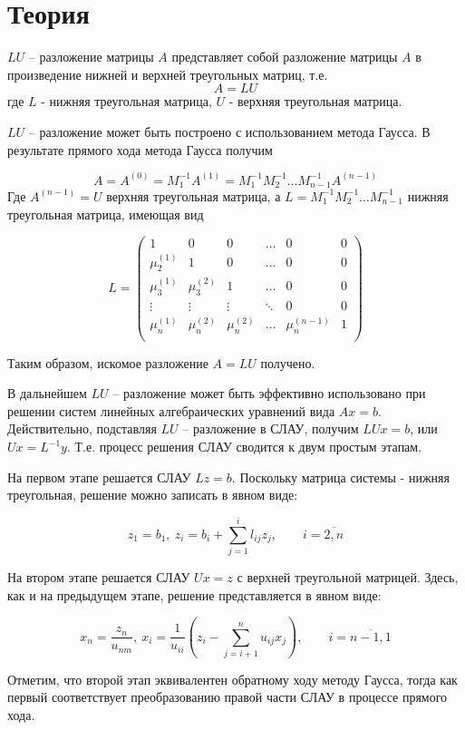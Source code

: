 \section*{Теория}

$LU$ – разложение матрицы $A$ представляет собой разложение 
матрицы $A$ в произведение
нижней и верхней треугольных матриц, т.е.
$$A= LU$$
где $L$ - нижняя треугольная матрица, $U$ - верхняя
треугольная матрица.

$LU$ – разложение может быть построено с использованием
метода Гаусса. В результате прямого
хода метода Гаусса получим

$$A=A^{(0)} = M^{-1}_1A^{(1)} = M^{-1}_1M^{-1}_2
\dots M^{-1}_{n-1}A^{(n-1)}$$
Где $A^{(n-1)} = U$ верхняя треугольная матрица,
а $L=M^{-1}_1M^{-1}_2\dots M^{-1}_{n-1}$ нижняя треугольная
матрица, имеющая вид

$$L=\begin{pmatrix}
    1 & 0 & 0 & \ldots & 0 & 0 \\
    \mu^{(1)}_2 & 1 & 0 & \ldots & 0 & 0 \\
    \mu^{(1)}_3 & \mu^{(2)}_3 & 1 & \ldots & 0 & 0 \\
    \vdots & \vdots & \vdots & \ddots & 0 & 0 \\
    \mu^{(1)}_n & \mu^{(2)}_n & \mu^{(2)}_n & \dots & \mu^{(n-1)}_n & 1 \\

\end{pmatrix}$$

Таким образом, искомое разложение $A = LU$ получено.

В дальнейшем $LU$ – разложение может быть эффективно
использовано при решении систем
линейных алгебраических уравнений вида $Ax = b$.
Действительно, подставляя $LU$ – разложение
в СЛАУ, получим $LUx = b$, или $Ux=L^{-1}y$.
Т.е. процесс решения
СЛАУ сводится к двум простым
этапам.

На первом этапе решается СЛАУ $Lz = b$. Поскольку матрица
системы - нижняя треугольная,
решение можно записать в явном виде:

$$z_1=b_1,\ 
z_i = b_i + \sum^i_{j=1} l_{ij}z_j,
\qquad i = \overline{2,n}$$

На втором этапе решается СЛАУ $Ux = z$ с верхней треугольной
матрицей. Здесь, как и на
предыдущем этапе, решение представляется в явном виде:

$$x_n = \frac{z_n}{u_{nm}},\ 
x_i = \frac{1}{u_{ii}}\left(z_i - \sum^n_{j=i+1} u_{ij}x_j\right),
\qquad i = \overline{n-1,1}$$

Отметим, что второй этап эквивалентен обратному ходу
методу Гаусса, тогда как первый
соответствует преобразованию правой части СЛАУ в процессе
прямого хода.
\pagebreak